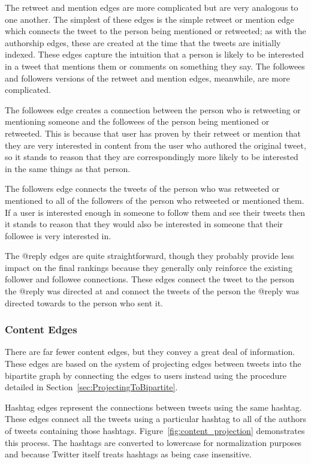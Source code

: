The retweet and mention edges are more complicated but are very analogous to one another. The simplest of these edges is the simple retweet or mention edge which connects the tweet to the person being mentioned or retweeted; as with the authorship edges, these are created at the time that the tweets are initially indexed. These edges capture the intuition that a person is likely to be interested in a tweet that mentions them or comments on something they say. The followees and followers versions of the retweet and mention edges, meanwhile, are more complicated.

The followees edge creates a connection between the person who is retweeting or mentioning someone and the followees of the person being mentioned or retweeted. This is because that user has proven by their retweet or mention that they are very interested in content from the user who authored the original tweet, so it stands to reason that they are correspondingly more likely to be interested in the same things as that person.

The followers edge connects the tweets of the person who was retweeted or mentioned to all of the followers of the person who retweeted or mentioned them. If a user is interested enough in someone to follow them and see their tweets then it stands to reason that they would also be interested in someone that their followee is very interested in.

The @reply edges are quite straightforward, though they probably provide less impact on the final rankings because they generally only reinforce the existing follower and followee connections. These edges connect the tweet to the person the @reply was directed at and connect the tweets of the person the @reply was directed towards to the person who sent it.


\subsubsection{Content Edges}

There are far fewer content edges, but they convey a great deal of information. These edges are based on the system of projecting edges between tweets into the bipartite graph by connecting the edges to users instead using the procedure detailed in Section~\ref{sec:ProjectingToBipartite}.

Hashtag edges represent the connections between tweets using the same hashtag. These edges connect all the tweets using a particular hashtag to all of the authors of tweets containing those hashtags. Figure~\ref{fig:content_projection} demonstrates this process. The hashtags are converted to lowercase for normalization purposes and because Twitter itself treats hashtags as being case insensitive.

